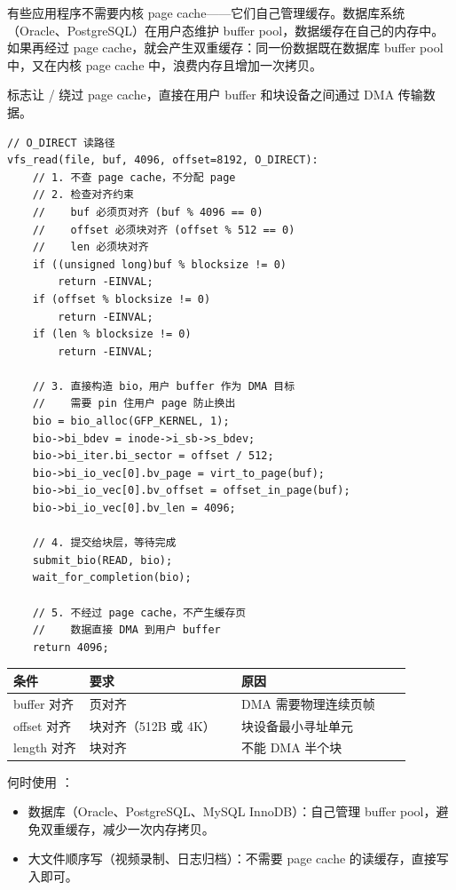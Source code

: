 \begin{filesystemlayout}

有些应用程序不需要内核 page cache——它们自己管理缓存。数据库系统（Oracle、PostgreSQL）在用户态维护 buffer pool，数据缓存在自己的内存中。如果再经过 page cache，就会产生双重缓存：同一份数据既在数据库 buffer pool 中，又在内核 page cache 中，浪费内存且增加一次拷贝。

 标志让 / 绕过 page cache，直接在用户 buffer 和块设备之间通过 DMA 传输数据。

\begin{lstlisting}
// O_DIRECT 读路径
vfs_read(file, buf, 4096, offset=8192, O_DIRECT):
    // 1. 不查 page cache，不分配 page
    // 2. 检查对齐约束
    //    buf 必须页对齐 (buf % 4096 == 0)
    //    offset 必须块对齐 (offset % 512 == 0)
    //    len 必须块对齐
    if ((unsigned long)buf % blocksize != 0)
        return -EINVAL;
    if (offset % blocksize != 0)
        return -EINVAL;
    if (len % blocksize != 0)
        return -EINVAL;

    // 3. 直接构造 bio，用户 buffer 作为 DMA 目标
    //    需要 pin 住用户 page 防止换出
    bio = bio_alloc(GFP_KERNEL, 1);
    bio->bi_bdev = inode->i_sb->s_bdev;
    bio->bi_iter.bi_sector = offset / 512;
    bio->bi_io_vec[0].bv_page = virt_to_page(buf);
    bio->bi_io_vec[0].bv_offset = offset_in_page(buf);
    bio->bi_io_vec[0].bv_len = 4096;

    // 4. 提交给块层，等待完成
    submit_bio(READ, bio);
    wait_for_completion(bio);

    // 5. 不经过 page cache，不产生缓存页
    //    数据直接 DMA 到用户 buffer
    return 4096;
\end{lstlisting}

\begin{longtable}{|F{0.17\linewidth}|F{0.34\linewidth}|F{0.38\linewidth}|}
\toprule
{}
条件 & 要求 & 原因 \\
\midrule
buffer 对齐 & 页对齐 & DMA 需要物理连续页帧 \\\tablerowrule
offset 对齐 & 块对齐（512B 或 4K） & 块设备最小寻址单元 \\\tablerowrule
length 对齐 & 块对齐 & 不能 DMA 半个块 \\
\bottomrule
\end{longtable}

何时使用 ：

\begin{itemize}
\tightlist
\item 数据库（Oracle、PostgreSQL、MySQL InnoDB）：自己管理 buffer pool，避免双重缓存，减少一次内存拷贝。
\item 大文件顺序写（视频录制、日志归档）：不需要 page cache 的读缓存，直接写入即可。
\end{itemize}


\end{filesystemlayout}
